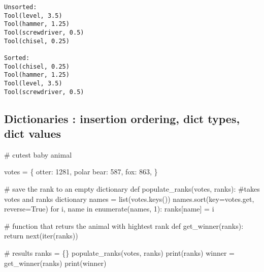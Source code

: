 \documentclass[
]{report}
\newenvironment{Shaded}{\begin{snugshade}}{\end{snugshade}}
\newcommand{\BuiltInTok}[1]{\textcolor[rgb]{0.00,0.23,0.31}{#1}}
\newcommand{\CommentTok}[1]{\textcolor[rgb]{0.37,0.37,0.37}{#1}}
\newcommand{\ControlFlowTok}[1]{\textcolor[rgb]{0.00,0.23,0.31}{#1}}
\newcommand{\DecValTok}[1]{\textcolor[rgb]{0.68,0.00,0.00}{#1}}
\newcommand{\KeywordTok}[1]{\textcolor[rgb]{0.00,0.23,0.31}{#1}}
\newcommand{\NormalTok}[1]{\textcolor[rgb]{0.00,0.23,0.31}{#1}}
\newcommand{\OperatorTok}[1]{\textcolor[rgb]{0.37,0.37,0.37}{#1}}
\newcommand{\StringTok}[1]{\textcolor[rgb]{0.13,0.47,0.30}{#1}}
\newcommand{\VariableTok}[1]{\textcolor[rgb]{0.07,0.07,0.07}{#1}}
\begin{document}
\begin{verbatim}
Unsorted:
Tool(level, 3.5)
Tool(hammer, 1.25)
Tool(screwdriver, 0.5)
Tool(chisel, 0.25)

Sorted:
Tool(chisel, 0.25)
Tool(hammer, 1.25)
Tool(level, 3.5)
Tool(screwdriver, 0.5)
\end{verbatim}

\hypertarget{dictionaries-insertion-ordering-dict-types-dict-values}{%
\subsection{Dictionaries : insertion ordering, dict types, dict
values}\label{dictionaries-insertion-ordering-dict-types-dict-values}}

\begin{Shaded}
\begin{Highlighting}[]
\CommentTok{\# cutest baby animal}

\NormalTok{votes }\OperatorTok{=}\NormalTok{ \{}
    \StringTok{\textquotesingle{}otter\textquotesingle{}}\NormalTok{: }\DecValTok{1281}\NormalTok{,}
    \StringTok{\textquotesingle{}polar bear\textquotesingle{}}\NormalTok{: }\DecValTok{587}\NormalTok{,}
    \StringTok{\textquotesingle{}fox\textquotesingle{}}\NormalTok{: }\DecValTok{863}\NormalTok{,}
\NormalTok{\}}

\CommentTok{\# save the rank to an empty dictionary}
\KeywordTok{def}\NormalTok{ populate\_ranks(votes, ranks):  }\CommentTok{\#takes votes and ranks dictionary}
\NormalTok{    names }\OperatorTok{=} \BuiltInTok{list}\NormalTok{(votes.keys())}
\NormalTok{    names.sort(key}\OperatorTok{=}\NormalTok{votes.get, reverse}\OperatorTok{=}\VariableTok{True}\NormalTok{)}
    \ControlFlowTok{for}\NormalTok{ i, name }\KeywordTok{in} \BuiltInTok{enumerate}\NormalTok{(names, }\DecValTok{1}\NormalTok{):}
\NormalTok{        ranks[name] }\OperatorTok{=}\NormalTok{ i}
    
\CommentTok{\# function that returs the animal with hightest rank}
\KeywordTok{def}\NormalTok{ get\_winner(ranks):}
    \ControlFlowTok{return} \BuiltInTok{next}\NormalTok{(}\BuiltInTok{iter}\NormalTok{(ranks))}

\CommentTok{\# results}
\NormalTok{ranks }\OperatorTok{=}\NormalTok{ \{\}}
\NormalTok{populate\_ranks(votes, ranks)}
\BuiltInTok{print}\NormalTok{(ranks)}
\NormalTok{winner }\OperatorTok{=}\NormalTok{ get\_winner(ranks)}
\BuiltInTok{print}\NormalTok{(winner)}
\end{Highlighting}
\end{Shaded}
\end{document}
